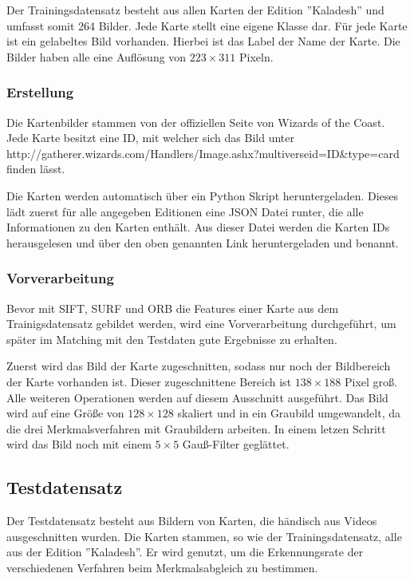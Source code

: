 Der Trainingsdatensatz besteht aus allen Karten der Edition ''Kaladesh'' und umfasst somit 264 Bilder. Jede Karte stellt eine eigene Klasse dar. Für jede Karte ist ein gelabeltes Bild vorhanden. Hierbei ist das Label der Name der Karte. Die Bilder haben alle eine Auflösung von $223 \times 311$ Pixeln.


\subsubsection{Erstellung}

Die Kartenbilder stammen von der offiziellen Seite von Wizards of the Coast. Jede Karte besitzt eine ID, mit welcher sich das Bild unter http://gatherer.wizards.com/Handlers/Image.ashx?multiverseid=ID\&type=card finden lässt.

Die Karten werden automatisch über ein Python Skript heruntergeladen. Dieses lädt zuerst für alle angegeben Editionen eine JSON Datei runter, die alle Informationen zu den Karten enthält. Aus dieser Datei werden die Karten IDs herausgelesen und über den oben genannten Link heruntergeladen und benannt.

\subsubsection{Vorverarbeitung}

Bevor mit SIFT, SURF und ORB die Features einer Karte aus dem Trainigsdatensatz gebildet werden, wird eine Vorverarbeitung durchgeführt, um später im Matching mit den Testdaten gute Ergebnisse zu erhalten.

Zuerst wird das Bild der Karte zugeschnitten, sodass nur noch der Bildbereich der Karte vorhanden ist. Dieser zugeschnittene Bereich ist $138 \times 188$ Pixel groß. Alle weiteren Operationen werden auf diesem Ausschnitt ausgeführt.
Das Bild wird auf eine Größe von $128 \times 128$ skaliert und in ein Graubild umgewandelt, da die drei Merkmalsverfahren mit Graubildern arbeiten.
In einem letzen Schritt wird das Bild noch mit einem $5 \times 5$ Gauß-Filter geglättet.

\subsection{Testdatensatz}

Der Testdatensatz besteht aus Bildern von Karten, die händisch aus Videos ausgeschnitten wurden. Die Karten stammen, so wie der Trainingsdatensatz, alle aus der Edition ''Kaladesh''. Er wird genutzt, um die Erkennungsrate der verschiedenen Verfahren beim Merkmalsabgleich zu bestimmen.

